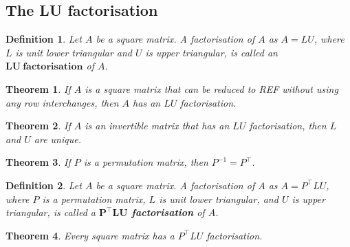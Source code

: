 \documentclass{article}
\theoremstyle{sltheorem}
\newtheorem{definition}{Definition}[section]
\newtheorem{theorem}{Theorem}[section]
\begin{document}
\subsection{The LU factorisation}
\begin{definition}
    Let $A$ be a square matrix. A factorisation of $A$ as $A=LU$, where $L$ is unit lower triangular and $U$ is upper triangular, is called an $\mathbf{LU\: factorisation}$ of $A$.
\end{definition}
\begin{theorem}
    If $A$ is a square matrix that can be reduced to REF without using any row interchanges, then $A$ has an $LU$ factorisation.
\end{theorem}
\begin{theorem}
    If $A$ is an invertible matrix that has an $LU$ factorisation, then $L$ and $U$ are unique.
\end{theorem}
\begin{theorem}
    If $P$ is a permutation matrix, then $P^{-1}=P^\intercal$.
\end{theorem}
\begin{definition}
    Let $A$ be a square matrix. A factorisation of $A$ as $A=P^\intercal LU$, where $P$ is a permutation matrix, $L$ is unit lower triangular, and $U$ is upper triangular, is called a \textbf{$\mathbf{P^\intercal LU}$ factorisation} of $A$.
\end{definition}
\begin{theorem}
    Every square matrix has a $P^\intercal LU$ factorisation.
\end{theorem}
\end{document}

